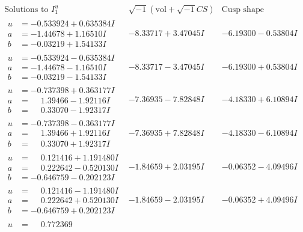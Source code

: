 \documentclass[1p]{elsarticle_modified}
\theoremstyle{definition}
\newcommand{\I}{\sqrt{-1}}
\begin{document}
$$\begin{array}{c|c|c}  
\text{Solutions to }I^u_{1}& \I (\text{vol} + \sqrt{-1}CS) & \text{Cusp shape}\\
 \hline 
\begin{aligned}
u &= -0.533924 + 0.635384 I \\
a &= -1.44678 + 1.16510 I \\
b &= -0.03219 + 1.54133 I\end{aligned}
 & -8.33717 + 3.47045 I & -6.19300 - 0.53804 I \\ \hline\begin{aligned}
u &= -0.533924 - 0.635384 I \\
a &= -1.44678 - 1.16510 I \\
b &= -0.03219 - 1.54133 I\end{aligned}
 & -8.33717 - 3.47045 I & -6.19300 + 0.53804 I \\ \hline\begin{aligned}
u &= -0.737398 + 0.363177 I \\
a &= \phantom{-}1.39466 - 1.92116 I \\
b &= \phantom{-}0.33070 - 1.92317 I\end{aligned}
 & -7.36935 - 7.82848 I & -4.18330 + 6.10894 I \\ \hline\begin{aligned}
u &= -0.737398 - 0.363177 I \\
a &= \phantom{-}1.39466 + 1.92116 I \\
b &= \phantom{-}0.33070 + 1.92317 I\end{aligned}
 & -7.36935 + 7.82848 I & -4.18330 - 6.10894 I \\ \hline\begin{aligned}
u &= \phantom{-}0.121416 + 1.191480 I \\
a &= \phantom{-}0.222642 - 0.520130 I \\
b &= -0.646759 - 0.202123 I\end{aligned}
 & -1.84659 + 2.03195 I & -0.06352 - 4.09496 I \\ \hline\begin{aligned}
u &= \phantom{-}0.121416 - 1.191480 I \\
a &= \phantom{-}0.222642 + 0.520130 I \\
b &= -0.646759 + 0.202123 I\end{aligned}
 & -1.84659 - 2.03195 I & -0.06352 + 4.09496 I \\ \hline\begin{aligned}
u &= \phantom{-}0.772369\phantom{ +0.000000I} \\

\end{aligned}
\end{array}$$
\end{document}

